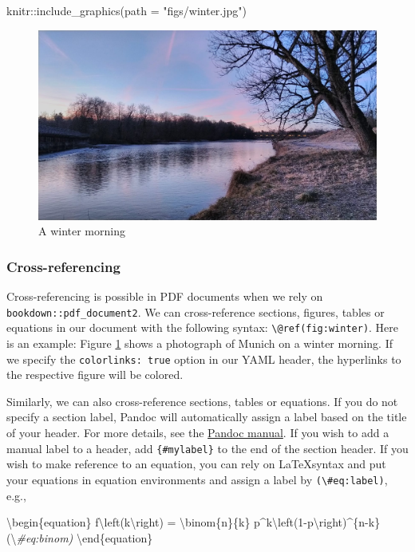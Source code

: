 \documentclass[
  11pt,
]{scrartcl}
\newenvironment{Shaded}{\begin{snugshade}}{\end{snugshade}}
\newcommand{\AttributeTok}[1]{\textcolor[rgb]{0.77,0.63,0.00}{#1}}
\newcommand{\CommentTok}[1]{\textcolor[rgb]{0.56,0.35,0.01}{\textit{#1}}}
\newcommand{\DecValTok}[1]{\textcolor[rgb]{0.00,0.00,0.81}{#1}}
\newcommand{\FunctionTok}[1]{\textcolor[rgb]{0.00,0.00,0.00}{#1}}
\newcommand{\NormalTok}[1]{#1}
\newcommand{\OtherTok}[1]{\textcolor[rgb]{0.56,0.35,0.01}{#1}}
\newcommand{\SpecialCharTok}[1]{\textcolor[rgb]{0.00,0.00,0.00}{#1}}
\newcommand{\StringTok}[1]{\textcolor[rgb]{0.31,0.60,0.02}{#1}}
\begin{document}
\begin{Shaded}
\begin{Highlighting}[]
\NormalTok{knitr}\SpecialCharTok{::}\FunctionTok{include\_graphics}\NormalTok{(}\AttributeTok{path =} \StringTok{"figs/winter.jpg"}\NormalTok{)}
\end{Highlighting}
\end{Shaded}

\begin{figure}

{\centering \includegraphics[width=0.3\linewidth]{figs/winter} 

}

\caption{A winter morning}\label{fig:winter}
\end{figure}

\hypertarget{cross-referencing}{%
\subsubsection{Cross-referencing}\label{cross-referencing}}

Cross-referencing is possible in PDF documents when we rely on \texttt{bookdown::pdf\_document2}. We can cross-reference sections, figures, tables or equations in our document with the following syntax: \texttt{\textbackslash{}@ref(fig:winter)}. Here is an example: Figure \ref{fig:winter} shows a photograph of Munich on a winter morning. If we specify the \texttt{colorlinks:\ true} option in our YAML header, the hyperlinks to the respective figure will be colored.

Similarly, we can also cross-reference sections, tables or equations. If you do not specify a section label, Pandoc will automatically assign a label based on the title of your header. For more details, see the \href{https://pandoc.org/MANUAL.html\#extension-auto_identifiers}{Pandoc manual}. If you wish to add a manual label to a header, add \texttt{\{\#mylabel\}} to the end of the section header. If you wish to make reference to an equation, you can rely on \LaTeX syntax and put your equations in equation environments and assign a label by \texttt{(\textbackslash{}\#eq:label)}, e.g.,

\begin{Shaded}
\begin{Highlighting}[]
\NormalTok{\textbackslash{}begin\{equation\} }
\NormalTok{  f\textbackslash{}}\FunctionTok{left}\NormalTok{(k\textbackslash{}right) }\OtherTok{=}\NormalTok{ \textbackslash{}binom\{n\}\{k\} p}\SpecialCharTok{\^{}}\NormalTok{k\textbackslash{}}\FunctionTok{left}\NormalTok{(}\DecValTok{1}\SpecialCharTok{{-}}\NormalTok{p\textbackslash{}right)}\SpecialCharTok{\^{}}\NormalTok{\{n}\SpecialCharTok{{-}}\NormalTok{k\}}
\NormalTok{  (\textbackslash{}}\CommentTok{\#eq:binom)}
\NormalTok{\textbackslash{}end\{equation\} }
\end{Highlighting}
\end{Shaded}
\end{document}

